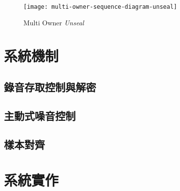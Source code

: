 \begin{figure}[H]
    \centering
    \texttt{[image: multi-owner-sequence-diagram-unseal]}
    \caption{Multi Owner {\it Unseal}}
    \label{fig.m-o-unseal}
\end{figure}


\section{系統機制}

\subsection{錄音存取控制與解密}

\subsection{主動式噪音控制}

\subsection{樣本對齊}

\section{系統實作}